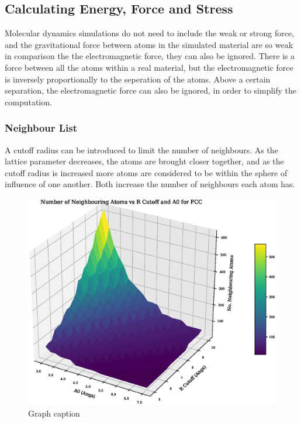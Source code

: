 \documentclass[12pt,twoside]{manual}
\begin{document}
\subsection{Calculating Energy, Force and Stress}

Molecular dynamics simulations do not need to include the weak or strong force, and the gravitational force between atoms in the simulated material are so weak in comparison the the electromagnetic force, they can also be ignored.  There is a force between all the atoms within a real material, but the electromagnetic force is inversely proportionally to the seperation of the atoms.  Above a certain separation, the electromagnetic force can also be ignored, in order to simplify the computation.

\subsubsection{Neighbour List}

A cutoff radius can be introduced to limit the number of neighbours.  As the lattice parameter decreases, the atoms are brought closer together, and as the cutoff radius is increased more atoms are considered to be within the sphere of influence of one another.  Both increase the number of neighbours each atom has.

\begin{figure}[!htbp]
  \begin{center}
    \includegraphics[scale=0.40]{img/atom_neighbours.eps}
    \caption{Graph caption}
    \label{graph:graph1}
  \end{center}
\end{figure}
\end{document}
